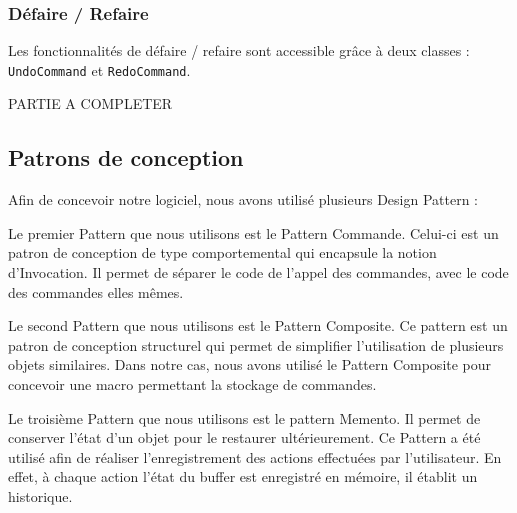 \documentclass[a4paper]{article}
\begin{document}
			\subsubsection{Défaire / Refaire}

			Les fonctionnalités de défaire / refaire sont accessible grâce à deux classes : \texttt{UndoCommand} et \texttt{RedoCommand}.


	PARTIE A COMPLETER

		\vspace{0.5cm}

		\subsection{Patrons de conception}

		\vspace{0.5cm}

		Afin de concevoir notre logiciel, nous avons utilisé plusieurs Design Pattern :

		\vspace{0.5cm}

		Le premier Pattern que nous utilisons est le Pattern Commande. Celui-ci est un patron de conception de type comportemental qui encapsule la notion d'Invocation. Il permet de séparer le code de l'appel des commandes, avec le code des commandes elles mêmes.

		\vspace{0.5cm}

		Le second Pattern que nous utilisons est le Pattern Composite. Ce pattern est un patron de conception structurel qui permet de simplifier l'utilisation de plusieurs objets similaires. Dans notre cas, nous avons utilisé le Pattern Composite pour concevoir une macro permettant la stockage de commandes.

		\vspace{0.5cm}

		Le troisième Pattern que nous utilisons est le pattern Memento. Il permet de conserver l’état d’un objet pour le restaurer ultérieurement. Ce Pattern a été utilisé afin de réaliser l’enregistrement des actions effectuées par l’utilisateur. En effet, à chaque action l’état du buffer est enregistré en mémoire, il établit un historique.

		\vspace{0.5cm}
\end{document}
